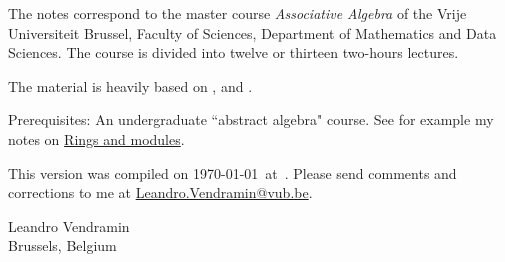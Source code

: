 \preface

The notes correspond to the master  
course \emph{Associative Algebra} of the 
Vrije Universiteit Brussel, 
Faculty of Sciences, 
Department of Mathematics and Data Sciences. The course
is divided into twelve or thirteen two-hours lectures. 

The material is heavily based on \cite{MR3308118}, \cite{MR1449137} and 
\cite{MR798076}. 

Prerequisites: An undergraduate ``abstract algebra" course. See for example
my notes on \href{https://github.com/vendramin/rings}{Rings and modules}. 

\medskip
This version 
was compiled on \today~at~\currenttime.
Please send comments and corrections to me at \url{Leandro.Vendramin@vub.be}. 


\bigskip
\begin{flushright}
Leandro Vendramin\\Brussels, Belgium\par
\end{flushright}

